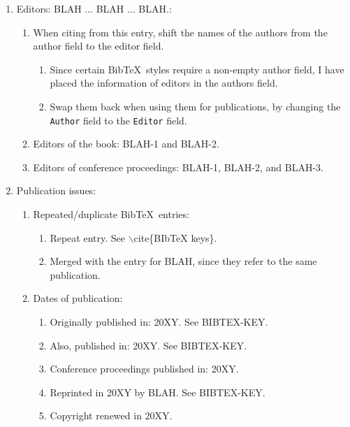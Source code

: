 \documentclass[letter,12pt]{article}
\begin{document}
\begin{enumerate}
\item Editors: BLAH ... BLAH ... BLAH.: \vspace{-0.3cm}
	\begin{enumerate} \itemsep -2pt
	\item When citing from this entry, shift the names of the authors from the author field to the editor field. \vspace{-0.2cm}
		\begin{enumerate} \itemsep -2pt
		\item Since certain {\sc Bib}\TeX\ styles require a non-empty author field, I have placed the information of editors in the authors field. 
		\item Swap them back when using them for publications, by changing the {\tt Author} field to the {\tt Editor} field.
		\end{enumerate}
	\item Editors of the book: BLAH-1 and BLAH-2.
	\item Editors of conference proceedings: BLAH-1, BLAH-2, and BLAH-3.
	\end{enumerate}
\item Publication issues: \vspace{-0.3cm}
	\begin{enumerate} \itemsep -2pt
	\item Repeated/duplicate {\sc Bib}\TeX\ entries: \vspace{-0.2cm}
		\begin{enumerate} \itemsep -2pt
		\item Repeat entry. See $\backslash$cite\{BIbTeX keys\}.
		\item Merged with the entry for BLAH, since they refer to the same publication.
		\end{enumerate}
	\item Dates of publication: \vspace{-0.2cm}
		\begin{enumerate} \itemsep -2pt
		\item Originally published in: 20XY. See BIBTEX-KEY.
		\item Also, published in: 20XY. See BIBTEX-KEY.
		\item Conference proceedings published in: 20XY.
		\item Reprinted in 20XY by BLAH. See BIBTEX-KEY.
		\item Copyright renewed in 20XY.

\end{enumerate}
\end{enumerate}
\end{enumerate}
\end{document}
